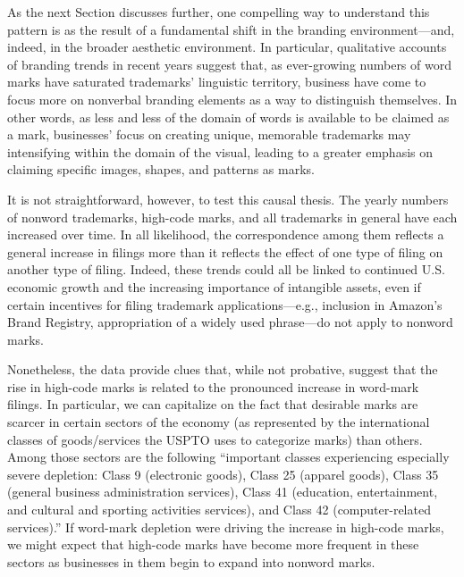 \documentclass[letterpaper, 11pt, oneside]{article}
\begin{document}
As the next Section discusses further, one compelling way to understand this pattern is as the result of a fundamental shift in the branding environment—and, indeed, in the broader aesthetic environment. In particular, qualitative accounts of branding trends in recent years suggest that, as ever-growing numbers of word marks have saturated trademarks' linguistic territory, business have come to focus more on nonverbal branding elements as a way to distinguish themselves. In other words, as less and less of the domain of words is available to be claimed as a mark, businesses' focus on creating unique, memorable trademarks may intensifying within the domain of the visual, leading to a greater emphasis on claiming specific images, shapes, and patterns as marks.

It is not straightforward, however, to test this causal thesis. The yearly numbers of nonword trademarks, high-code marks, and all trademarks in general have each increased over time. In all likelihood, the correspondence among them reflects a general increase in filings more than it reflects the effect of one type of filing on another type of filing. Indeed, these trends could all be linked to continued U.S. economic growth and the increasing importance of intangible assets, even if certain incentives for filing trademark applications—e.g., inclusion in Amazon's Brand Registry, appropriation of a widely used phrase—do not apply to nonword marks.

Nonetheless, the data provide clues that, while not probative, suggest that the rise in high-code marks is related to the pronounced increase in word-mark filings. In particular, we can capitalize on the fact that desirable marks are scarcer in certain sectors of the economy (as represented by the international classes of goods/services the USPTO uses to categorize marks) than others. Among those sectors are the following ``important classes experiencing especially severe depletion: Class 9 (electronic goods), Class 25 (apparel goods), Class 35 (general business administration services), Class 41 (education, entertainment, and cultural and sporting activities services), and Class 42 (computer-related services).'' If word-mark depletion were driving the increase in high-code marks, we might expect that high-code marks have become more frequent in these sectors as businesses in them begin to expand into nonword marks.
\end{document}
